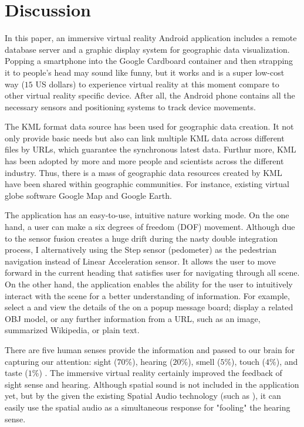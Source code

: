 \chapter{Discussion}
\label{chapter-discussion}

In this paper, an immersive virtual reality Android application includes a remote database server and a graphic display system for geographic data visualization. Popping a smartphone into the Google Cardboard container and then strapping it to people's head may sound like funny, but it works and is a super low-cost way ($15$ US dollars) to experience virtual reality at this moment compare to other virtual reality specific device. After all, the Android phone contains all the necessary sensors and positioning systems to track device movements.

The KML format data source has been used for geographic data creation. It not only provide basic needs but also can link multiple KML data across different files by URLs, which guarantee the synchronous latest data. Furthur more, KML has been adopted by more and more people and scientists across the different industry. Thus, there is a mass of geographic data resources created by KML have been shared within geographic communities. For instance, existing virtual globe software Google Map and Google Earth.

The application has an easy-to-use, intuitive nature working mode. On the one hand, a user can make a six degrees of freedom (DOF) movement. Although due to the sensor fusion creates a huge drift during the nasty double integration process, I alternatively using the Step sensor (pedometer) as the pedestrian navigation instead of Linear Acceleration sensor. It allows the user to move forward in the current heading that satisfies user for navigating through all scene. On the other hand, the application enables the ability for the user to intuitively interact with the scene for a better understanding of information. For example, select a  and view the details of the  on a popup message board; display a  related OBJ model, or any further information from a URL, such as an image, summarized Wikipedia, or plain text.

There are five human senses provide the information and passed to our brain for capturing our attention: sight ($70$\%), hearing ($20$\%), smell ($5$\%), touch ($4$\%), and taste ($1$\%) \cite{mazuryk.vr.1996}. The immersive virtual reality certainly improved the feedback of sight sense and hearing. Although spatial sound is not included in the application yet, but by the given the existing Spatial Audio technology (such as \cite{google.spatial-audio.2016}), it can easily use the spatial audio as a simultaneous response for "fooling" the hearing sense.

